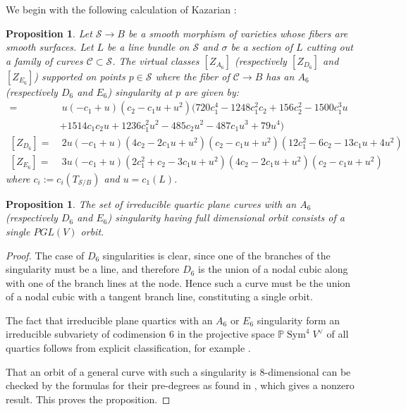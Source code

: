 \documentclass[12 pt, reqno]{amsart}
\newtheorem{prop}[thm]{Proposition}
\theoremstyle{definition}
\newcommand{\on}{\operatorname}
\newcommand{\mb}{\mathbb}
\newcommand{\mc}{\mathcal}
\begin{document}
We begin with the following calculation of Kazarian \cite[Theorem
1]{Kazarian}:
\begin{prop}
  \label{Kaztheman}
  Let $\mc{S}\to B$ be a smooth morphism of varieties whose fibers are
  smooth surfaces. Let $L$ be a line bundle on $\mc{S}$ and $\sigma$
  be a section of $L$ cutting out a family of curves
  $\mc{C}\subset \mc{S}$. The virtual classes $[Z_{A_6}]$
  (respectively $[Z_{D_6}]$ and $[Z_{E_6}]$) supported on points
  $p\in \mc{S}$ where the fiber of $\mc{C}\to B$ has an $A_6$
  (respectively $D_6$ and $E_6$) singularity at $p$ are given by:
\begin{align*} 
[Z_{A_6}]=&\ u (-c_1 + u) (c_2 - c_1 u + u^2) (720 c_1^4
  - 1248 c_1^2 c_2 + 156 c_2^2 - 1500 c_1^3 u\\& + 1514 c_1 c_2 u+
  1236 c_1^2 u^2 - 485 c_2 u^2 -
  487 c_1 u^3 + 79 u^4)\\
  [Z_{D_6}] =&\ 2 u (-c_1 + u) (4 c_2 - 2 c_1 u + u^2) (c_2 - c_1 u + u^2) (12 c_1^2 - 
   6 c_2 - 13 c_1 u + 4 u^2)\\
  [Z_{E_6}] =&\ 3 u (-c_1 + u) (2 c_1^2 + c_2 - 3 c_1 u + u^2)(4 c_2 - 2
              c_1 u + u^2) (c_2 - c_1 u + u^2)
   \end{align*}
 where $c_i:=c_i(T_{\mc{S}/B})$ and $u=c_1(L)$. 
\end{prop}



\begin{prop}
\label{oneorbit}
The set of irreducible quartic plane curves with an $A_6$
(respectively $D_6$ and $E_6$) singularity having full dimensional
orbit consists of a single $PGL(V)$ orbit.
\end{prop}
\begin{proof}
  The case of $D_6$ singularities is clear, since one of the branches
  of the singularity must be a line, and therefore $D_6$ is the union
  of a nodal cubic along with one of the branch lines at the node.
  Hence such a curve must be the union of a nodal cubic with a tangent
  branch line, constituting a single orbit.


  The fact that irreducible plane quartics with an $A_6$ or $E_6$
  singularity form an irreducible subvariety of codimension $6$ in the
  projective space $\mb{P} \on{Sym}^{4}V^{\vee}$ of all quartics
  follows from explicit classification, for example \cite[Section
  3.4]{Nejad2}. 

  That an orbit of a general curve with such a singularity is
  $8$-dimensional can be checked by the formulas for their pre-degrees
  as found in \cite[Examples 5.2 and 5.4]{AF00}, which gives a nonzero
  result. This proves the proposition.
\end{proof}
\end{document}
